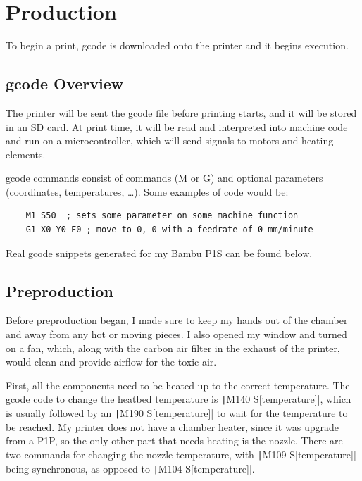 \documentclass[11pt,a4paper]{article}
\begin{document}
\section{Production}

To begin a print, gcode is downloaded onto the printer and it begins execution.

\subsection{gcode Overview}

The printer will be sent the gcode file before printing starts, and it will be stored in an SD card. At print time, it will be read and interpreted into machine code and run on a microcontroller, which will send signals to motors and heating elements.

gcode commands consist of commands (M or G) and optional parameters (coordinates, temperatures, \ldots). Some examples of code would be:

\begin{verbatim}
    M1 S50  ; sets some parameter on some machine function
    G1 X0 Y0 F0 ; move to 0, 0 with a feedrate of 0 mm/minute
\end{verbatim}

\noindent
Real gcode snippets generated for my Bambu P1S can be found below.

\subsection{Preproduction}

Before preproduction began, I made sure to keep my hands out of the chamber and away from any hot or moving pieces. I also opened my window and turned on a fan, which, along with the carbon air filter in the exhaust of the printer, would clean and provide airflow for the toxic air.

\bigbreak\noindent
First, all the components need to be heated up to the correct temperature. The gcode code to change the heatbed temperature is \texttt|M140 S[temperature]|, which is usually followed by an \texttt|M190 S[temperature]| to wait for the temperature to be reached. My printer does not have a chamber heater, since it was upgrade from a P1P, so the only other part that needs heating is the nozzle. There are two commands for changing the nozzle temperature, with \texttt|M109 S[temperature]| being synchronous, as opposed to \texttt|M104 S[temperature]|.
\end{document}
